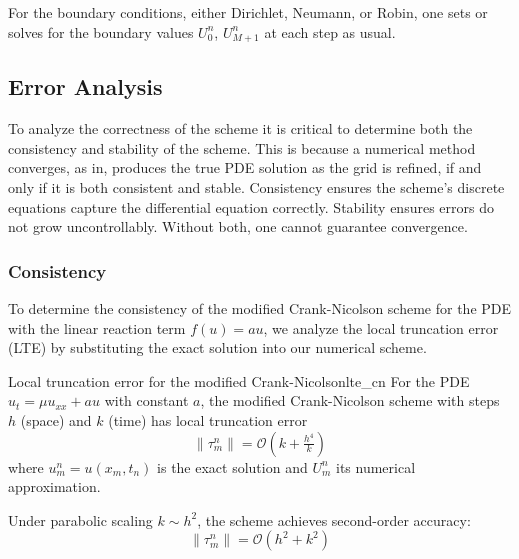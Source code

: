 
For the boundary conditions, either Dirichlet, Neumann, or Robin, one sets or solves for the boundary
values \(U_0^n\), \(U_{M+1}^n\) at each step as usual.

\subsection{Error Analysis}
To analyze the correctness of the scheme it is critical to determine both the consistency and stability of the
scheme. This is because a numerical method converges, as in, produces the true PDE solution as the grid is refined, 
if and only if it is both consistent and stable. Consistency ensures the scheme’s discrete equations capture 
the differential equation correctly. Stability ensures errors do not grow uncontrollably. Without both, one cannot 
guarantee convergence.


\subsubsection{Consistency}
To determine the consistency of the modified Crank-Nicolson scheme for the PDE with the linear reaction term 
$f(u) = au$, we analyze the local truncation error (LTE) by substituting the exact solution into our 
numerical scheme.

\begin{theorem}{Local truncation error for the modified Crank-Nicolson}{lte_cn}
    For the PDE $u_t = \mu u_{xx} + au$ with constant $a$, the modified Crank-Nicolson scheme with steps $h$ (space) 
    and $k$ (time) has local truncation error
    \[
      \|\tau_m^n\| = \mathcal{O}\!\left(k +\tfrac{h^4}{k}\right)
    \]
    where $u_m^n = u(x_m,t_n)$ is the exact solution and $U_m^n$ its numerical approximation.
  
    Under parabolic scaling $k \sim h^2$, the scheme achieves second-order accuracy:
    \[
      \|\tau_m^n\| = \mathcal{O}\!\left(h^2 + k^2\right)
    \]
\end{theorem}


